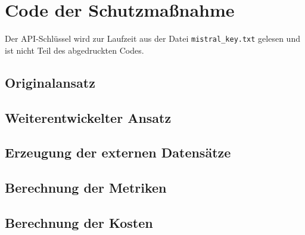 \chapter{Code der Schutzmaßnahme}\label{ch:code}

Der API-Schlüssel wird zur Laufzeit aus der Datei \texttt{mistral\_key.txt} gelesen und ist nicht Teil des abgedruckten Codes.

\section{Originalansatz}\label{sec:code_original}


\section{Weiterentwickelter Ansatz}\label{sec:code_new_approach}


\section{Erzeugung der externen Datensätze}\label{sec:code_bipia}


\section{Berechnung der Metriken}\label{sec:code_metrics}


\section{Berechnung der Kosten}\label{sec:code_kosten}

